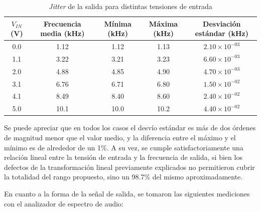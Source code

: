 \documentclass[../../tc_tp6_main.tex]{subfiles}
\begin{document}
\begin{table}[H]
	\centering
	\begin{tabular}{|c||c|c|c|c|}
	\hline
	$V_{IN}$ (V) 	& Frecuencia media (kHz) 	& M\'inima (kHz) 	& M\'axima (kHz) 	& Desviaci\'on est\'andar (kHz) 	\\ \hline \hline
	0.0          		& 1.12                   		& 1.12                      	& 1.13                      	& $2.10\times 10^{-03}$           	\\ \hline
	1.1          		& 3.22                   		& 3.21                      	& 3.23                      	& $6.60\times 10^{-03}$           	\\ \hline
	2.0          		& 4.88                   		& 4.85                      	& 4.90                      	& $4.70\times 10^{-03}$           	\\ \hline
	3.1          		& 6.76                   		& 6.71                     	& 6.80                      	& $1.50\times 10^{-02}$           	\\ \hline
	4.1          		& 8.49                   		& 8.40                      	& 8.60                      	& $2.40\times 10^{-02}$          	\\ \hline
	5.0          		& 10.1                   		& 10.0                      	& 10.2                      	& $4.40\times 10^{-02}$           	\\ \hline
	\end{tabular}
	\caption{\textit{Jitter} de la salida para distintas tensiones de entrada}
\end{table}

Se puede apreciar que en todos los casos el desv\'io est\'andar es m\'as de dos \'ordenes de magnitud menor que el valor medio, y la diferencia entre el m\'aximo y el m\'inimo es de alrededor de un 1\%. A su vez, se cumple satisfactoriamente una relaci\'on lineal entre la tensi\'on de entrada y la frecuencia de salida, si bien los defectos de la transformaci\'on lineal previamente explicados no permitieron cubrir la totalidad del rango propuesto, sino un 98.7\% del mismo aproximadamente.\par 

En cuanto a la forma de la se\~nal de salida, se tomaron las siguientes mediciones con el analizador de espectro de audio: 
\end{document}
